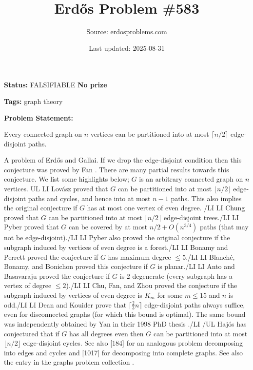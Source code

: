 \documentclass{article}
\title{Erd\H{o}s Problem \#583}
\date{Last updated: 2025-08-31}
\author{Source: erdosproblems.com}
\begin{document}
\maketitle

\noindent\textbf{Status:} FALSIFIABLE \quad \textbf{No prize}

\noindent\textbf{Tags:} graph theory

\medskip

\noindent\textbf{Problem Statement:}

Every connected graph on $n$ vertices can be partitioned into at most $\lceil n/2\rceil$ edge-disjoint paths.




A problem of Erd\H{o}s and Gallai. If we drop the edge-disjoint condition then this conjecture was proved by Fan \cite{Fa02}. There are many partial results towards this conjecture. We list some highlights below; $G$ is an arbitrary connected graph on $n$ vertices. {UL} {LI} Lov\'{a}sz \cite{Lo68} proved that $G$ can be partitioned into at most $\lfloor n/2\rfloor$ edge-disjoint paths and cycles, and hence into at most $n-1$ paths. This also implies the original conjecture if $G$ has at most one vertex of even degree. {/LI} {LI} Chung \cite{Ch78} proved that $G$ can be partitioned into at most $\lceil n/2\rceil$ edge-disjoint trees.{/LI} {LI} Pyber \cite{Py96} proved that $G$ can be covered by at most $n/2+O(n^{3/4})$ paths (that may not be edge-disjoint).{/LI} {LI} Pyber \cite{Py96} also proved the original conjecture if the subgraph induced by vertices of even degree is a forest.{/LI} {LI} Bonamy and Perrett \cite{BoPe19} proved the conjecture if $G$ has maximum degree $\leq 5$.{/LI} {LI} Blanch\'{e}, Bonamy, and Bonichon \cite{BBB21} proved this conjecture if $G$ is planar.{/LI} {LI} Anto and Basavaraju \cite{AnBa23} proved the conjecture if $G$ is $2$-degenerate (every subgraph has a vertex of degree $\leq 2$).{/LI} {LI} Chu, Fan, and Zhou \cite{CFZ26} proved the conjecture if the subgraph induced by vertices of even degree is $K_m$ for some $m\leq 15$ and $n$ is odd.{/LI} {LI} Dean and Kouider \cite{DeKo00} prove that $\lceil \frac{2}{3}n\rceil$ edge-disjoint paths always suffice, even for disconnected graphs (for which this bound is optimal). The same bound was independently obtained by Yan in their 1998 PhD thesis .{/LI} {/UL} Haj\'{o}s \cite{Lo68} has conjectured that if $G$ has all degrees even then $G$ can be partitioned into at most $\lfloor n/2\rfloor$ edge-disjoint cycles. See also [184] for an analogous problem decomposing into edges and cycles and [1017] for decomposing into complete graphs. See also the entry in the graphs problem collection .
\end{document}
